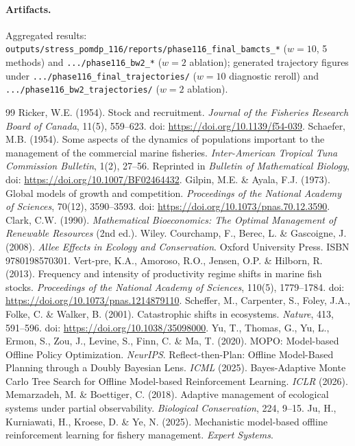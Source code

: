 \documentclass[11pt]{article}
\begin{document}
\paragraph{Artifacts.} Aggregated results:
\texttt{outputs/stress\_pomdp\_116/reports/phase116\_final\_bamcts\_*} ($w=10$, 5 methods)
and \texttt{.../phase116\_bw2\_*} ($w=2$ ablation); generated trajectory figures under
\texttt{.../phase116\_final\_trajectories/} ($w=10$ diagnostic reroll) and
\texttt{.../phase116\_bw2\_trajectories/} ($w=2$ ablation).

\begin{thebibliography}{99}
 Ricker, W.E. (1954). Stock and recruitment.
\emph{Journal of the Fisheries Research Board of Canada}, 11(5), 559--623.
doi: \url{https://doi.org/10.1139/f54-039}.
 Schaefer, M.B. (1954). Some aspects of the dynamics of populations
important to the management of the commercial marine fisheries.
\emph{Inter-American Tropical Tuna Commission Bulletin}, 1(2), 27--56.
Reprinted in \emph{Bulletin of Mathematical Biology}, doi:
\url{https://doi.org/10.1007/BF02464432}.
 Gilpin, M.E. \& Ayala, F.J. (1973). Global models of growth and
competition. \emph{Proceedings of the National Academy of Sciences}, 70(12), 3590--3593.
doi: \url{https://doi.org/10.1073/pnas.70.12.3590}.
 Clark, C.W. (1990). \emph{Mathematical Bioeconomics: The Optimal
Management of Renewable Resources} (2nd ed.). Wiley.
 Courchamp, F., Berec, L. \& Gascoigne, J. (2008). \emph{Allee
Effects in Ecology and Conservation}. Oxford University Press. ISBN 9780198570301.
 Vert-pre, K.A., Amoroso, R.O., Jensen, O.P. \& Hilborn, R. (2013).
Frequency and intensity of productivity regime shifts in marine fish stocks.
\emph{Proceedings of the National Academy of Sciences}, 110(5), 1779--1784.
doi: \url{https://doi.org/10.1073/pnas.1214879110}.
 Scheffer, M., Carpenter, S., Foley, J.A., Folke, C. \& Walker, B.
(2001). Catastrophic shifts in ecosystems. \emph{Nature}, 413, 591--596.
doi: \url{https://doi.org/10.1038/35098000}.
 Yu, T., Thomas, G., Yu, L., Ermon, S., Zou, J., Levine, S., Finn, C.
\& Ma, T. (2020). MOPO: Model-based Offline Policy Optimization. \emph{NeurIPS}.
 Reflect-then-Plan: Offline Model-Based Planning through a Doubly
Bayesian Lens. \emph{ICML} (2025).
 Bayes-Adaptive Monte Carlo Tree Search for Offline Model-based
Reinforcement Learning. \emph{ICLR} (2026).
 Memarzadeh, M. \& Boettiger, C. (2018). Adaptive management of
ecological systems under partial observability. \emph{Biological Conservation}, 224, 9--15.
 Ju, H., Kurniawati, H., Kroese, D. \& Ye, N. (2025). Mechanistic
model-based offline reinforcement learning for fishery management. \emph{Expert Systems}.
\end{thebibliography}
\end{document}
